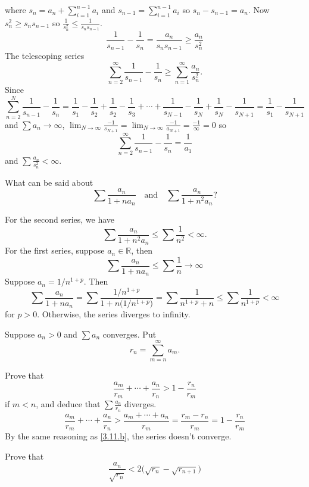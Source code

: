 \begin{exercise}
\begin{exercise}[label = (\alph*), ref = \arabic{exercisei} (\alph*)]
\[    \]
    where \(s_n = a_n + \sum_{i = 1}^{n - 1}a_i\) and
    \(s_{n - 1} = \sum_{i = 1}^{n - 1}a_i\) so \(s_n - s_{n - 1} = a_n\).
    Now \(s_n^2\geq s_ns_{n - 1}\) so
    \(\frac{1}{s_n^2}\leq\frac{1}{s_ns_{n - 1}}\).
    \[
    \frac{1}{s_{n - 1}} - \frac{1}{s_n} = \frac{a_n}{s_ns_{n - 1}}\geq
    \frac{a_n}{s_n^2}
    \]
    The telescoping series
    \[
    \sum_{n = 2}^{\infty}\frac{1}{s_{n - 1}} - \frac{1}{s_n}\geq
    \sum_{n = 1}^{\infty}\frac{a_n}{s_n^2}.
    \]
    Since
    \[
    \sum_{n = 2}^N\frac{1}{s_{n - 1}} - \frac{1}{s_n} =
    \frac{1}{s_1} - \frac{1}{s_2} + \frac{1}{s_2} - \frac{1}{s_3} + \cdots +
    \frac{1}{s_{N - 1}} - \frac{1}{s_N} + \frac{1}{s_N} - \frac{1}{s_{N + 1}}
    = \frac{1}{s_1} - \frac{1}{s_{N + 1}}
    \]
    and \(\sum a_n\to\infty\), \(\lim_{N\to\infty}\frac{-1}{s_{N + 1}} =
    \lim_{N\to\infty}\frac{-1}{a_{N + 1}} = \frac{-1}{\infty} = 0\) so
    \[
    \sum_{n = 2}^{\infty}\frac{1}{s_{n - 1}} - \frac{1}{s_n} = \frac{1}{a_1}
    \]
    and \(\sum\frac{a_n}{s_n^2} < \infty\).
  \item
    What can be said about
    \[
    \sum\frac{a_n}{1 + na_n}\quad\text{and}\quad\sum\frac{a_n}{1 + n^2a_n}
    \mbox{?}
    \]
    \par\smallskip
    For the second series, we have
    \[
    \sum\frac{a_n}{1 + n^2a_n}\leq\sum\frac{1}{n^2} < \infty.
    \]
    For the first series, suppose \(a_n\in\mathbb{R}\), then
    \[
    \sum\frac{a_n}{1 + na_n}\leq\sum\frac{1}{n}\to\infty
    \]
    Suppose \(a_n = 1/n^{1 + p}\).
    Then
    \[
    \sum\frac{a_n}{1 + na_n} =
    \sum\frac{1/n^{1 + p}}{1 + n\bigl(1/n^{1 + p}\bigr)} =
    \sum\frac{1}{n^{1 + p} + n}\leq\sum\frac{1}{n^{1 + p}} < \infty
    \]
    for \(p > 0\).
    Otherwise, the series diverges to infinity.
  \end{exercise}
\item
  Suppose \(a_n > 0\) and \(\sum a_n\) converges.
  Put
  \[
  r_n = \sum_{m = n}^{\infty}a_m.
  \]
  \begin{exercise}[label = (\alph*)]
  \item
    Prove that
    \[
    \frac{a_m}{r_m} + \cdots + \frac{a_n}{r_n} > 1 - \frac{r_n}{r_m}
    \]
    if \(m < n\), and deduce that \(\sum\frac{a_n}{r_n}\) diverges.
    \[
    \frac{a_m}{r_m} + \cdots + \frac{a_n}{r_n} >
    \frac{a_m + \cdots + a_n}{r_m} = \frac{r_m - r_n}{r_m} =
    1 - \frac{r_n}{r_m}
    \]
    By the same reasoning as \cref{3.11.b}, the series doesn't converge.
  \item
    Prove that
    \[
    \frac{a_n}{\sqrt{r_n}} < 2\bigl(\sqrt{r_n} - \sqrt{r_{n + 1}}\bigr)
\]
\end{exercise}
\end{exercise}
